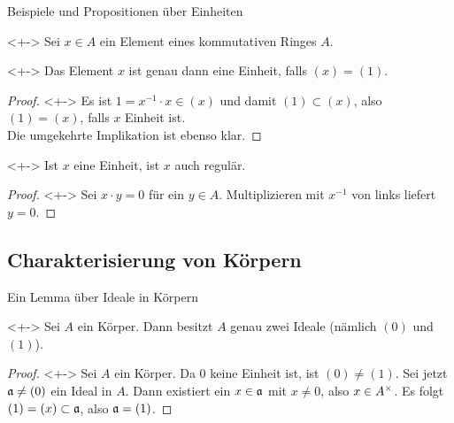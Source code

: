 \begin{frame}{Beispiele und Propositionen über Einheiten}
    \begin{visibleenv}<+->
        Sei \(x \in A\) ein Element eines kommutativen Ringes \(A\).
    \end{visibleenv}
    \begin{proposition}<+->
        Das Element \(x\) ist genau dann eine Einheit, falls
        \((x) = (1)\).
    \end{proposition}
    \begin{proof}<+->
        Es ist \(1 = x^{-1} \cdot x \in (x)\) und damit \((1) \subset (x)\), also \((1) = (x)\), falls \(x\) Einheit ist.
        \\
        Die umgekehrte Implikation ist ebenso klar.
    \end{proof}
    \begin{proposition}<+->
        Ist \(x\) eine Einheit, ist \(x\) auch regulär.
    \end{proposition}
    \begin{proof}<+->
        Sei \(x \cdot y = 0\) für ein \(y \in A\). Multiplizieren mit \(x^{-1}\) von
        links liefert \(y = 0\).
    \end{proof}
\end{frame}

\subsection{Charakterisierung von Körpern}

\begin{frame}{Ein Lemma über Ideale in Körpern}
    \begin{lemma}<+->
        Sei \(A\) ein Körper. Dann besitzt \(A\) genau zwei Ideale (nämlich
        \((0)\) und \((1)\)).
    \end{lemma}
    \begin{proof}<+->
        Sei \(A\) ein Körper. Da \(0\) keine Einheit ist, ist \((0) \neq (1)\).
        Sei jetzt \(\mathfrak{a} \neq (0)\) ein Ideal in \(A\). Dann existiert ein
        \(x \in \mathfrak{a}\) mit \(x \neq 0\), also \(x \in A^\times\). Es folgt
        \((1) = (x) \subset \mathfrak{a}\), also \(\mathfrak{a} = (1)\).
    \end{proof}
\end{frame}

